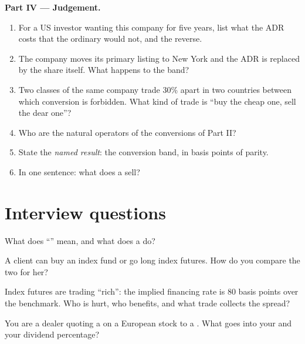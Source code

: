 \begin{problem}
\medskip\noindent\textbf{Part IV --- Judgement.}
\begin{enumerate}[resume]
\item For a US investor wanting this company for five years, list what the
ADR costs that the ordinary would not, and the reverse.
\item The company moves its primary listing to New York and the ADR is
replaced by the share itself. What happens to the band?
\item Two classes of the same company trade 30\% apart in two countries
between which conversion is forbidden. What kind of trade is ``buy the cheap
one, sell the dear one''?
\item Who are the natural operators of the conversions of Part II?
\item State the \emph{named result}: the conversion band, in basis points of
parity.
\item In one sentence: what does a  sell?
\end{enumerate}
\end{problem}

\section{Interview questions}

\begin{interviewq}\label{iq:m1:delta-one-instruments:1}
What does ``'' mean, and what does a  do?
\end{interviewq}

\begin{interviewq}\label{iq:m1:delta-one-instruments:2}
A client can buy an index fund or go long index futures. How do you compare
the two for her?
\end{interviewq}

\begin{interviewq}\label{iq:m1:delta-one-instruments:3}
Index futures are trading ``rich'': the implied financing rate is 80 basis
points over the benchmark. Who is hurt, who benefits, and what trade
collects the spread?
\end{interviewq}

\begin{interviewq}\label{iq:m1:delta-one-instruments:4}
You are a dealer quoting a  on a European stock to a . What goes into your  and your dividend percentage?
\end{interviewq}

